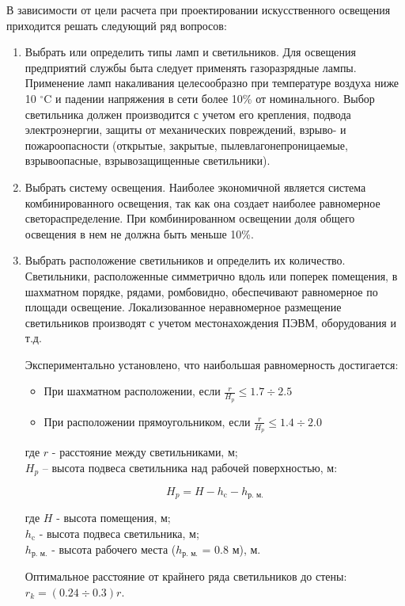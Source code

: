 В зависимости от цели расчета при проектировании искусственного освещения приходится решать следующий ряд вопросов:
\begin{enumerate}
\item Выбрать или определить типы ламп и светильников. Для освещения предприятий службы быта следует применять газоразрядные лампы. Применение ламп накаливания целесообразно при температуре воздуха ниже 10 $^\circ\mbox{C}$ и падении напряжения в сети более 10\% от номинального.
Выбор светильника должен производится с учетом его крепления, подвода электроэнергии, защиты от механических повреждений, взрыво- и пожароопасности (открытые, закрытые, пылевлагонепроницаемые, взрывоопасные, взрывозащищенные светильники).
\item Выбрать систему освещения. Наиболее экономичной является система комбинированного освещения, так как она создает наиболее равномерное светораспределение.
При комбинированном освещении доля общего освещения в нем не должна быть меньше 10\%.
\item Выбрать расположение светильников и определить их количество. Светильники, расположенные симметрично вдоль или поперек помещения, в шахматном порядке, рядами, ромбовидно, обеспечивают равномерное по площади освещение. Локализованное неравномерное размещение светильников производят с учетом местонахождения ПЭВМ, оборудования и т.д.

Экспериментально установлено, что наибольшая равномерность достигается:
\begin{itemize}
\item При шахматном расположении, если $\frac{r}{H_p} \leq 1.7 \div 2.5$
\item При расположении прямоугольником, если $\frac{r}{H_p} \leq 1.4 \div 2.0$
\end{itemize}
где $r$ - расстояние между светильниками, м; \\ $H_p$ – высота подвеса светильника над рабочей поверхностью, м:

\begin{equation}
H_p = H - h_{\text{c}} - h_{\text{р. м.}}
\label{F:Hp}
\end{equation}

где $H$ - высота помещения, м; \\ $h_{\text{c}}$ - высота подвеса светильника, м; \\ $h_{\text{р. м.}}$ - высота рабочего места ($h_{\text{р. м.}}$ = 0.8 м), м.

Оптимальное расстояние от крайнего ряда светильников до стены: $r_k = (0.24 \div 0.3)r$.


\end{enumerate}
